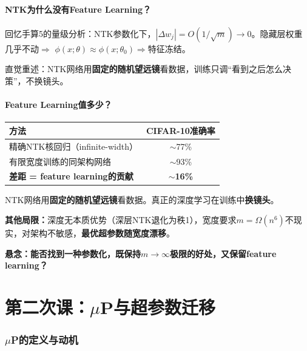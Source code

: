 \documentclass[11pt,a4paper]{article}
\begin{document}
\subsection{NTK为什么没有Feature Learning？}

回忆手算5的量级分析：NTK参数化下，$|\Delta w_j|=O(1/\sqrt{m})\to 0$。隐藏层权重几乎不动$\Rightarrow$ $\phi(x;\theta)\approx\phi(x;\theta_0)$$\Rightarrow$特征冻结。

直觉重述：NTK网络用\textbf{固定的随机望远镜}看数据，训练只调``看到之后怎么决策''，不换镜头。

\subsection{Feature Learning值多少？}

\begin{tcolorbox}[colback=red!8,colframe=red!60!black,title=\textbf{Feature Learning的量化价值}]
\begin{center}
\begin{tabular}{lc}
\toprule
方法 & CIFAR-10准确率 \\
\midrule
精确NTK核回归（infinite-width） & $\sim$77\% \\
有限宽度训练的同架构网络 & $\sim$93\% \\
\textbf{差距 = feature learning的贡献} & \textbf{$\sim$16\%} \\
\bottomrule
\end{tabular}
\end{center}
NTK网络用\textbf{固定的随机望远镜}看数据。真正的深度学习在训练中\textbf{换镜头}。

\textbf{其他局限：}深度无本质优势（深层NTK退化为秩1），宽度要求$m=\Omega(n^6)$不现实，对架构不敏感，\textbf{最优超参数随宽度漂移}。

\textbf{悬念：能否找到一种参数化，既保持$m\to\infty$极限的好处，又保留feature learning？}
\end{tcolorbox}

\newpage
\part{第二次课：$\mu$P与超参数迁移}

\section{$\mu$P的定义与动机}
\end{document}
